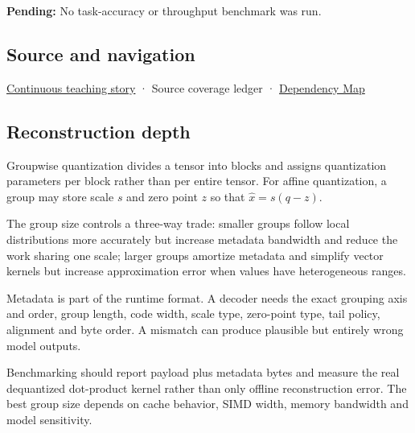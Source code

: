 \textbf{Pending:} No task-accuracy or throughput benchmark was run.

\subsection{Source and navigation}\label{appendix-638204c40e8b-source-and-navigation}

\hyperref[01-foundations-i-ch001-choosing-what-information-to-keep]{Continuous teaching story} · {Source coverage ledger} · \hyperref[appendix-4ad47bdd269a]{Dependency Map}

\subsection{Reconstruction depth}\label{appendix-638204c40e8b-reconstruction-depth}

Groupwise quantization divides a tensor into blocks and assigns quantization parameters per block rather than per entire tensor. For affine quantization, a group may store scale \(s\) and zero point \(z\) so that \(\hat x=s(q-z)\).

The group size controls a three-way trade: smaller groups follow local distributions more accurately but increase metadata bandwidth and reduce the work sharing one scale; larger groups amortize metadata and simplify vector kernels but increase approximation error when values have heterogeneous ranges.

Metadata is part of the runtime format. A decoder needs the exact grouping axis and order, group length, code width, scale type, zero-point type, tail policy, alignment and byte order. A mismatch can produce plausible but entirely wrong model outputs.

Benchmarking should report payload plus metadata bytes and measure the real dequantized dot-product kernel rather than only offline reconstruction error. The best group size depends on cache behavior, SIMD width, memory bandwidth and model sensitivity.

